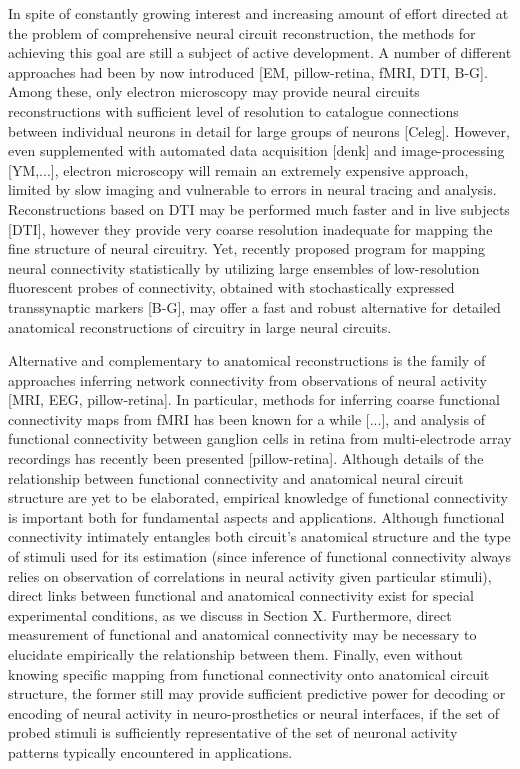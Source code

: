 \documentclass[amsmath,amssymb]{revtex4}
\begin{document}
In spite of constantly growing interest and increasing amount of effort directed at the problem of comprehensive neural circuit reconstruction, the methods for achieving this goal are still a subject of active development. A number of different approaches had been by now introduced [EM, pillow-retina, fMRI, DTI, B-G]. Among these, only electron microscopy may provide neural circuits reconstructions with sufficient level of resolution to catalogue connections between individual neurons in detail for large groups of neurons [Celeg]. However, even supplemented with automated data acquisition [denk] and image-processing [YM,...], electron microscopy will remain an extremely expensive approach, limited by slow imaging and vulnerable to errors in neural tracing and analysis. Reconstructions based on DTI may be performed much faster and in live subjects [DTI], however they provide very coarse resolution inadequate for mapping the fine structure of neural circuitry. Yet, recently proposed program for mapping neural connectivity statistically by utilizing large ensembles of low-resolution fluorescent probes of connectivity, obtained with stochastically expressed transsynaptic markers [B-G], may offer a fast and robust alternative for detailed anatomical reconstructions of circuitry in large neural circuits.

Alternative and complementary to anatomical reconstructions is the family of approaches inferring network connectivity from observations of neural activity [MRI, EEG, pillow-retina]. In particular, methods for inferring coarse functional connectivity maps from fMRI has been known for a while [...], and analysis of functional connectivity between ganglion cells in retina from multi-electrode array recordings has recently been presented [pillow-retina]. Although details of the relationship between functional connectivity and anatomical neural circuit structure are yet to be elaborated, empirical knowledge of functional connectivity is important both for fundamental aspects and applications. Although functional connectivity intimately entangles both circuit's anatomical structure and the type of stimuli used for its estimation (since inference of functional connectivity always relies on observation of correlations in neural activity given particular stimuli), direct links between functional and anatomical connectivity exist for special experimental conditions, as we discuss in Section X. Furthermore, direct measurement of functional and anatomical connectivity may be necessary to elucidate empirically the relationship between them. Finally, even without knowing specific mapping from functional connectivity onto anatomical circuit structure, the former still may provide sufficient predictive power for decoding or encoding of neural activity in neuro-prosthetics or neural interfaces, if the set of probed stimuli is sufficiently representative of the set of neuronal activity patterns typically encountered in applications.
\end{document}
